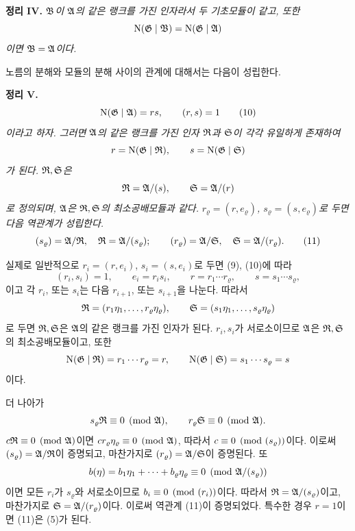 \medskip
\noindent\textbf{정리 IV.} \emph{\(\mathfrak B\)이 \(\mathfrak A\)의 같은 랭크를 가진 인자라서 두 기초모듈이 같고, 또한
\[
\operatorname N(\mathfrak G\mid\mathfrak B)=\operatorname N(\mathfrak G\mid\mathfrak A)
\]
이면 \(\mathfrak B=\mathfrak A\)이다.}

노름의 분해와 모듈의 분해 사이의 관계에 대해서는 다음이 성립한다.

\medskip
\noindent\textbf{정리 V.} \emph{
\begin{equation}
\operatorname N(\mathfrak G\mid\mathfrak A)=rs,\qquad(r,s)=1
\tag{10}
\end{equation}
이라고 하자. 그러면 \(\mathfrak A\)의 같은 랭크를 가진 인자 \(\mathfrak R\)과 \(\mathfrak S\)이 각각 유일하게 존재하여
\[
r=\operatorname N(\mathfrak G\mid\mathfrak R),\qquad
s=\operatorname N(\mathfrak G\mid\mathfrak S)
\]
가 된다. \(\mathfrak R,\mathfrak S\)은
\[
\mathfrak R=\mathfrak A/(s),\qquad
\mathfrak S=\mathfrak A/(r)
\]
로 정의되며, \(\mathfrak A\)은 \(\mathfrak R,\mathfrak S\)의 최소공배모듈과 같다.}
\emph{\(r_\varrho=(r,e_\varrho)\), \(s_\varrho=(s,e_\varrho)\)로 두면 다음 역관계가 성립한다.
\begin{equation}
(s_\varrho)=\mathfrak A/\mathfrak R,\quad
\mathfrak R=\mathfrak A/(s_\varrho);\qquad
(r_\varrho)=\mathfrak A/\mathfrak S,\quad
\mathfrak S=\mathfrak A/(r_\varrho).
\tag{11}
\end{equation}}

실제로 일반적으로 \(r_i=(r,e_i)\), \(s_i=(s,e_i)\)로 두면 (9), (10)에 따라
\[
(r_i,s_i)=1,\qquad e_i=r_is_i,\qquad
r=r_1\cdots r_\varrho,\qquad s=s_1\cdots s_\varrho,
\]
이고 각 \(r_i\), 또는 \(s_i\)는 다음 \(r_{i+1}\), 또는 \(s_{i+1}\)을 나눈다. 따라서
\[
\mathfrak R=(r_1\eta_1,\ldots,r_\varrho\eta_\varrho),\qquad
\mathfrak S=(s_1\eta_1,\ldots,s_\varrho\eta_\varrho)
\]
로 두면 \(\mathfrak R,\mathfrak S\)은 \(\mathfrak A\)의 같은 랭크를 가진 인자가 된다. \(r_i,s_i\)가 서로소이므로 \(\mathfrak A\)은 \(\mathfrak R,\mathfrak S\)의 최소공배모듈이고, 또한
\[
\operatorname N(\mathfrak G\mid\mathfrak R)=r_1\cdots r_\varrho=r,\qquad
\operatorname N(\mathfrak G\mid\mathfrak S)=s_1\cdots s_\varrho=s
\]
이다.

더 나아가
\[
s_\varrho\mathfrak R\equiv0\pmod{\mathfrak A},\qquad
r_\varrho\mathfrak S\equiv0\pmod{\mathfrak A}.
\]
\(c\mathfrak R\equiv0\pmod{\mathfrak A}\)이면 \(cr_\varrho\eta_\varrho\equiv0\pmod{\mathfrak A}\), 따라서 \(c\equiv0\pmod{(s_\varrho)}\)이다. 이로써 \((s_\varrho)=\mathfrak A/\mathfrak R\)이 증명되고, 마찬가지로 \((r_\varrho)=\mathfrak A/\mathfrak S\)이 증명된다. 또
\[
b(\eta)=b_1\eta_1+\cdots+b_\varrho\eta_\varrho
\equiv0\pmod{\mathfrak A/(s_\varrho)}
\]
이면 모든 \(r_i\)가 \(s_\varrho\)와 서로소이므로 \(b_i\equiv0\pmod{(r_i)}\)이다. 따라서 \(\mathfrak R=\mathfrak A/(s_\varrho)\)이고, 마찬가지로 \(\mathfrak S=\mathfrak A/(r_\varrho)\)이다. 이로써 역관계 (11)이 증명되었다. 특수한 경우 \(r=1\)이면 (11)은 (5)가 된다.

